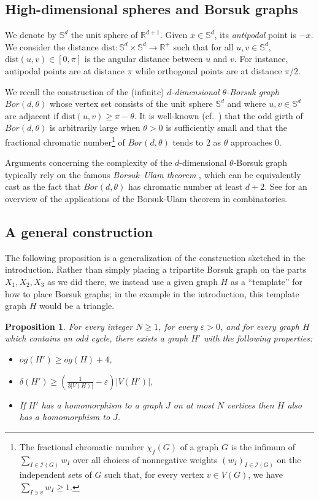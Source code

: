\documentclass{article}
\newtheorem{proposition}[theorem]{Proposition}
\newcommand{\dist}{\text{dist}}
\begin{document}
\subsection{High-dimensional spheres and Borsuk graphs}

We denote by $\mathbb{S}^d$ the unit sphere of $\mathbb R^{d+1}$. Given $x\in \mathbb{S}^d$, its \emph{antipodal} point is $-x$. 
We consider the distance $\dist : \mathbb{S}^d \times \mathbb{S}^d \to \mathbb{R}^+$ such that for all $u, v \in \mathbb{S}^d$, $\dist(u, v) \in [0, \pi]$ is the angular distance between $u$ and $v$. For instance, antipodal points are at distance $\pi$ while orthogonal points are at distance $\pi/2$. 

We recall the construction of the (infinite) \emph{$d$-dimensional $\theta$-Borsuk graph} $Bor(d,\theta)$ whose vertex set consists of the unit sphere $\mathbb{S}^d$ and where $u, v \in \mathbb{S}^d$ are adjacent if $\dist(u, v) \geq \pi-\theta$. 
It is well-known (cf.~\cite{EH67}) that the odd girth of $Bor(d,\theta)$ is arbitrarily large when $\theta>0$ is sufficiently small and that the fractional chromatic number\footnote{The fractional chromatic number $\chi_f(G)$ of a graph $G$ is the infimum of $\sum_{I\in\mathcal I(G)} w_I$ over all choices of nonnegative weights $(w_I)_{I\in\mathcal I(G)}$ on the independent sets of $G$ such that, for every vertex $v\in V(G)$, we have $\sum_{I\ni v} w_I\geq 1$.
}
of $Bor(d,\theta)$ tends to $2$ as $\theta$ approaches $0$. 

Arguments concerning the complexity of the $d$-dimensional $\theta$-Borsuk graph typically rely on the famous \emph{Borsuk--Ulam theorem} \cite{B33}, which can be equivalently cast as the fact that $Bor(d, \theta)$ has chromatic number at least $d+2$. 
See \cite{M03} for an overview of the applications of the Borsuk-Ulam theorem in combinatorics.

\subsection{A general construction}
The following proposition is a generalization of the construction sketched in the introduction. Rather than simply placing a tripartite Borsuk graph on the parts $X_1,X_2,X_3$ as we did there, we instead use a given graph $H$ as a ``template'' for how to place Borsuk graphs; in the example in the introduction, this template graph $H$ would be a triangle.

\begin{proposition}\label{prop:construction}
    For every integer $N \geq 1$, for every $\varepsilon > 0$, and for every graph $H$ which contains an odd cycle, there exists a graph $H'$ with the following properties: \begin{itemize}
        \item $og(H') \geq og(H) + 4$,
        \item $\delta(H') \geq \left(\frac{1}{3|V(H)|} - \varepsilon\right)|V(H')|$,
        \item If $H'$ has a homomorphism to a graph $J$ on at most $N$ vertices then $H$ also has a homomorphism to $J$.
    \end{itemize}
\end{proposition}
\end{document}
